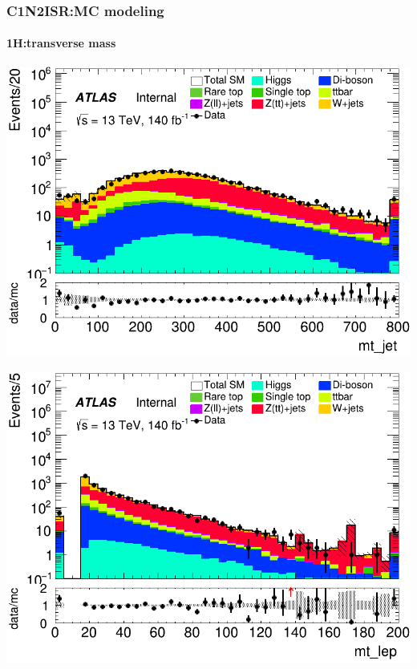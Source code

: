 \documentclass[usenames,dvipsnames]{beamer}
\begin{document}
\begin{frame}
\frametitle{C1N2ISR:MC modeling}
\framesubtitle{1H:\quad transverse mass}
    \begin{minipage}{0.32\textwidth}
        \centering
        \includegraphics[width=\textwidth]{graphics/H_met/H_met_mt_jet.png}
    \end{minipage}
    \hfill
    \begin{minipage}{0.32\textwidth}
        \centering
        \includegraphics[width=\textwidth]{graphics/H_met/H_met_mt_lep.png}
    \end{minipage}
    \hfill
    \begin{minipage}{0.32\textwidth}
        \centering

\end{minipage}
\end{frame}
\end{document}

